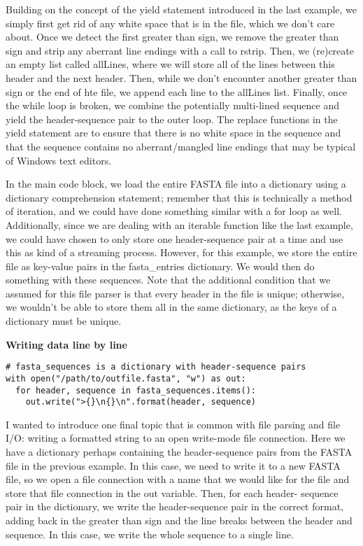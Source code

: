 \documentclass[a4paper,11pt]{article}
\begin{document}
Building on the concept of the yield statement introduced in the last example, we simply first 
get rid of any white space that is in the file, which we don't care about.  Once we detect the 
first greater than sign, we remove the greater than sign and strip any aberrant line endings 
with a call to rstrip.  Then, we (re)create an empty list called allLines, where we will store 
all of the lines between this header and the next header.  Then, while we don't encounter another 
greater than sign or the end of hte file, we append each line to the allLines list.  Finally, 
once the while loop is broken, we combine the potentially multi-lined sequence and yield the 
header-sequence pair to the outer loop.  The replace functions in the yield statement are 
to ensure that there is no white space in the sequence and that the sequence contains no 
aberrant/mangled line endings that may be typical of Windows text editors.  \par

In the main code block, we load the entire FASTA file into a dictionary using a dictionary 
comprehension statement; remember that this is technically a method of iteration, and we 
could have done something similar with a for loop as well.  Additionally, since we are 
dealing with an iterable function like the last example, we could have chosen to only 
store one header-sequence pair at a time and use this as kind of a streaming process.  
However, for this example, we store the entire file as key-value pairs in the fasta\_entries 
dictionary.  We would then do something with these sequences.  Note that the additional 
condition that we assumed for this file parser is that every header in the file is unique; 
otherwise, we wouldn't be able to store them all in the same dictionary, as the keys of a 
dictionary must be unique.



\pagebreak
\textbf{Writing data line by line}
\vspace{3mm}
\begin{lstlisting}
# fasta_sequences is a dictionary with header-sequence pairs
with open("/path/to/outfile.fasta", "w") as out:
  for header, sequence in fasta_sequences.items():
    out.write(">{}\n{}\n".format(header, sequence)
\end{lstlisting}
\vspace{3mm}

I wanted to introduce one final topic that is common with file parsing and file I/O: writing 
a formatted string to an open write-mode file connection.  Here we have a dictionary perhaps 
containing the header-sequence pairs from the FASTA file in the previous example.  In this case, 
we need to write it to a new FASTA file, so we open a file connection with a name that we would 
like for the file and store that file connection in the out variable.  Then, for each header-
sequence pair in the dictionary, we write the header-sequence pair in the correct format, 
adding back in the greater than sign and the line breaks between the header and sequence.  
In this case, we write the whole sequence to a single line.  \par
\end{document}

